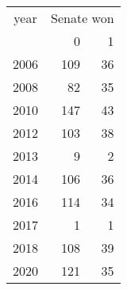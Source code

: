 \footnotesize\begin{tabular}[t]{lrr}
\toprule
\multicolumn{1}{c}{year} & \multicolumn{2}{c}{Senate won} \\
\cmidrule(l{3pt}r{3pt}){1-1} \cmidrule(l{3pt}r{3pt}){2-3}
  & 0 & 1\\
\midrule
2006 & 109 & 36\\
2008 & 82 & 35\\
2010 & 147 & 43\\
2012 & 103 & 38\\
2013 & 9 & 2\\
2014 & 106 & 36\\
2016 & 114 & 34\\
2017 & 1 & 1\\
2018 & 108 & 39\\
2020 & 121 & 35\\
\bottomrule
\end{tabular}
